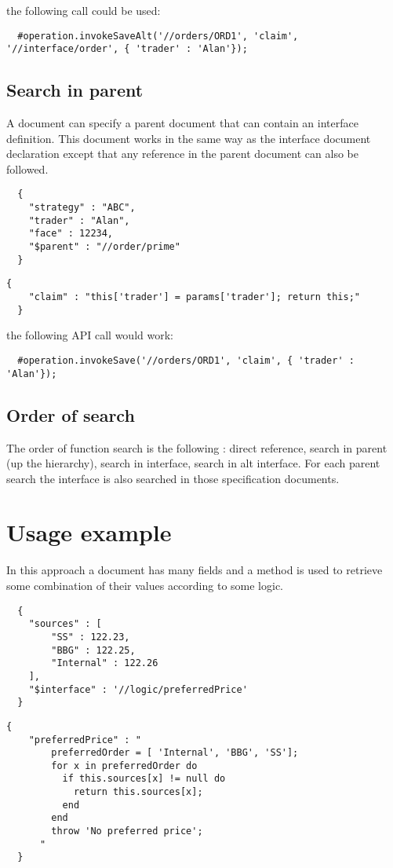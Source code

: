 the following call could be used:

\begin{lstlisting}
  #operation.invokeSaveAlt('//orders/ORD1', 'claim', '//interface/order', { 'trader' : 'Alan'});
\end{lstlisting}

\subsection{Search in parent}
A \Rapture document can specify a parent document that can contain an interface definition. This document works in the same
way as the interface document declaration except that any reference in the parent document can also be followed.

\begin{lstlisting}
  {
    "strategy" : "ABC",
    "trader" : "Alan",
    "face" : 12234,
    "$parent" : "//order/prime"
  }
\end{lstlisting}

\begin{lstlisting}[caption={//order/prime}]
  {
    "claim" : "this['trader'] = params['trader']; return this;"
  }
\end{lstlisting}

the following API call would work:

\begin{lstlisting}
  #operation.invokeSave('//orders/ORD1', 'claim', { 'trader' : 'Alan'});
\end{lstlisting}

\subsection{Order of search}
The order of function search is the following : direct reference, search in parent (up the hierarchy), search in interface, search in alt interface. For each parent search the interface
is also searched in those specification documents.

\section{Usage example}
In this approach a document has many fields and a method is used to retrieve some combination of their values according to some logic.
\begin{lstlisting}
  {
    "sources" : [
        "SS" : 122.23,
        "BBG" : 122.25,
        "Internal" : 122.26
    ],
    "$interface" : '//logic/preferredPrice'
  }
\end{lstlisting}
\begin{lstlisting}[caption={//logic/preferredPrice}]
  {
    "preferredPrice" : "
        preferredOrder = [ 'Internal', 'BBG', 'SS'];
        for x in preferredOrder do
          if this.sources[x] != null do
            return this.sources[x];
          end
        end
        throw 'No preferred price';
      "
  }
\end{lstlisting}

